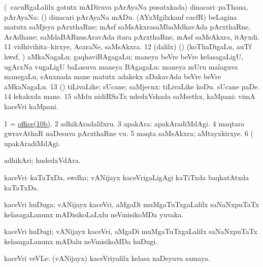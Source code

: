 \hypertarget{office(10b)}{} 
 (\roVkAyx\ cacuRgaLalilx gotutx mADiruva pArAyaNa pusatxkada) dinacari--paThana, pArAyaNa:  (\roVkAyx) dinacari pArAyaNa mADu. 
 (AYxMgilxkanf cacfR) beLagina matutx saMjeya pArxthaRne; mAsf saMsAkxrasaMbaMdhavAda pArxthaRne, ArAdhane; saMdaBARnusAravAda itara pArxthaRne, mAsf saMsAkxra, itAyxdi. 
\eanum
\numie
\num{11} vidhivihita--kirxye, AcaraNe, saMsAkxra. 
\num{12} (\bava dalilx) (\birx) (koThaDigaLu, auTf hwsf, \mo) aMkaNagaLu; gaqhaviBAgagaLu; maneya beVre beVre kelasagaLigU, ugArxNa \mo vugaLigU baLasuva maneya BAgagaLu:  maneya mUru malaguva manegaLu, sAnxnada mane matutx adakekx aDakavAda beVre beVre aMkaNagaLu. 
\num{13} (\ashi) tiLivaLike; sUcane; saMjecnx:  tiLivaLike koDu.  sUcane paDe. 
\num{14} lekakxda mane. 
\num{15} oMdu nidiRSaTx udedxVshada saMsethx, kaMpani:  vimA kaceVri kaMpani. 
\enum
\emng

\noindent
\gl{\pagu}
\bmng
\bnum
\num{1}  = \hyperlink{office(10b)}{office(10b)}. 
\num{2}  adhikAradalilxru. 
\num{3}  apakAra:  apakAradiMdAgi. 
\num{4}  maqtara gwravAthaR naDesuva pArxthaRne \mo vu. 
\num{5}  maqta saMsAkxra; aMtayxkirxye. 
\num{6}  (  upakAradiMdAgi. 
\enum
\emng
\eentry

\bentry
{}
\gl{\nA}
\bmng
adhikAri; hudedxVdAra. 
\emng
\eentry

\bentry
{}
\gl{\nA}
\bmng
kaceVri--kaTaTxDa, swdha; vANijayx kaceVrigaLigAgi kaTiTxda baqhatAtxda kaTaTxDa. 
\emng
\eentry

\bentry
{}
\gl{\nA}
\bmng
kaceVri huDuga; vANijayx kaceVri, aMgaDi muMgaTuTxgaLalilx saNaNxpuTaTx kelasagaLanunx mADisikoLaLxlu neVmisikoMDa yuvaka. 
\emng
\eentry

\bentry
{}
\gl{\nA}
\bmng
kaceVri huDugi; vANijayx kaceVri, aMgaDi muMgaTuTxgaLalilx saNaNxpuTaTx kelasagaLanunx mADalu neVmisikoMDa huDugi. 
\emng
\eentry

\bentry
{}
\gl{\nA}
\bmng
kaceVri veVLe: (vANijayx) kaceVriyalilx kelasa naDeyuva samaya. 
\emng
\eentry

